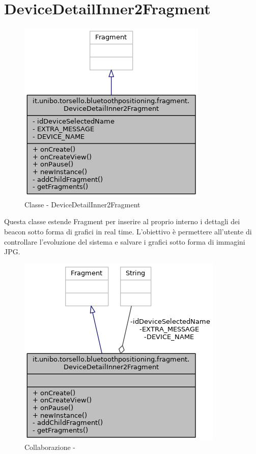 \section{DeviceDetailInner2Fragment}
\begin{figure}[ph]
	\centering
	\includegraphics[width=0.5\linewidth]{img/uml/class/classit_1_1unibo_1_1torsello_1_1bluetoothpositioning_1_1fragment_1_1DeviceDetailInner2Fragment__inherit__graph.png}
	\caption{Classe - DeviceDetailInner2Fragment}
\end{figure}

Questa classe estende Fragment per inserire al proprio interno i dettagli dei beacon sotto forma di grafici in real time. L'obiettivo è permettere all'utente di controllare l'evoluzione del sistema e salvare i grafici sotto forma di immagini JPG.

\begin{figure}[ph]
	\centering
	\includegraphics[width=0.55\linewidth]{img/uml/class/classit_1_1unibo_1_1torsello_1_1bluetoothpositioning_1_1fragment_1_1DeviceDetailInner2Fragment__coll__graph.png}
	\caption{Collaborazione - }
\end{figure}

\newpage
